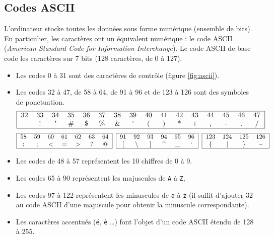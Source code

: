 \subsection{Codes ASCII}\label{ascii}
L'ordinateur stocke toutes les données sous forme numérique
(ensemble de bits). En particulier, les caractères ont un équivalent numérique : 
le code ASCII ({\em American Standard Code for Information Interchange}). 
Le code ASCII de base code les caractères sur 7 bits (128 caractères, de 0 à 127).
\begin{itemize}
\item Les codes 0 à 31 sont des caractères de contrôle (figure \ref{fig:ascii}).
\item Les codes 32 à 47, de 58 à 64, de 91 à 96 et de 123 à 126 
	sont des symboles de ponctuation.
{\footnotesize\tt$$\begin{tabular}{|cccccccccccccccc|}
\hline
32 & 33 & 34 & 35 & 36 & 37 & 38 & 39 & 40 & 41 & 42 & 43 & 44 & 45 & 46 & 47 \\
   & !  & " 	& \# & \$ & \% & \& & '  & (  &	)  & * 	& +  & ,  & -  & .  & / \\
\hline
\end{tabular}$$}
{\footnotesize\tt$$\begin{tabular}{|ccccccc|}
\hline
58 & 59 & 60 & 61 & 62 & 63 & 64 \\
:  & ;  & <  & =  & >  & ?  & @	\\
\hline
\end{tabular}\hspace*{2mm}
\begin{tabular}{|cccccc|}
\hline
91 & 92 & 93 & 94 & 95 & 96 \\
\char`[ & \char`\\ & \char`] & \char`^ & \_ & ` \\
\hline
\end{tabular}\hspace*{2mm}
\begin{tabular}{|cccc|}
\hline
123 & 124 & 125 & 126 \\
 \{  & |  & \}  & \char`~ \\
\hline
\end{tabular}$$}
\item Les codes de 48 à 57 représentent les 10 chiffres de 0 à 9.
\item Les codes 65 à 90 représentent les majuscules de {\tt A} à {\tt Z},
\item Les codes 97 à 122 représentent les minuscules de {\tt a} à {\tt z}
	(il suffit d'ajouter 32 au code ASCII d'une majuscule
	pour obtenir la minuscule correspondante).
\item Les caractères accentués ({\tt é}, {\tt è} \ldots) font l'objet d'un code ASCII étendu
	de 128 à 255.
\end{itemize}

